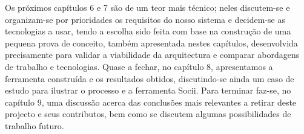 \indent Os próximos capítulos 6 e 7 são de um teor mais técnico; neles discutem-se e organizam-se por prioridades os requisitos do nosso sistema e decidem-se as tecnologias a usar, tendo a escolha sido feita com base na construção de uma pequena prova de conceito, também apresentada nestes capítulos, desenvolvida precisamente para validar a viabilidade da arquitectura e comparar abordagens de trabalho e tecnologias. Quase a fechar, no capítulo 8, apresentamos a ferramenta construída e os resultados obtidos, discutindo-se ainda um caso de estudo para ilustrar o processo e a ferramenta Socii. Para terminar faz-se, no capítulo 9, uma discussão acerca das conclusões mais relevantes a retirar deste projecto e seus contributos, bem como se discutem algumas possibilidades de trabalho futuro.
